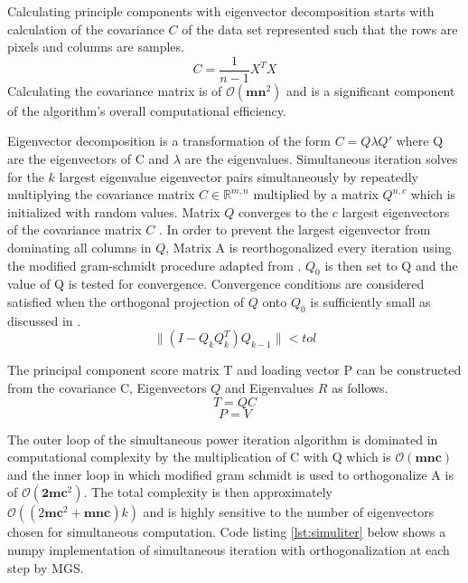 \documentclass[12pt]{article}
\begin{document}
Calculating principle components with eigenvector decomposition starts with calculation of the covariance $C$ of the data set represented such that the rows are pixels and columns are samples. 
$$C=\frac{1}{n-1}X^TX$$
Calculating the covariance matrix is of $\mathcal{O}(\textbf{mn}^2)$ and is a significant component of the algorithm’s overall computational efficiency.

Eigenvector decomposition is a transformation of the form $C=Q \lambda Q'$ where Q are the eigenvectors of C and $\lambda$ are the eigenvalues. Simultaneous iteration solves for the $k$ largest eigenvalue eigenvector pairs simultaneously by repeatedly multiplying the covariance matrix $C \in \mathbb{R}^{m,n}$ multiplied by a matrix $Q^{n,c}$ which is initialized with random values. Matrix $Q$ converges to the $c$ largest eigenvectors of the covariance matrix $C$ \cite{trefethen1997numerical}. In order to prevent the largest eigenvector from dominating all columns in $Q$, Matrix A is reorthogonalized every iteration using the modified gram-schmidt procedure adapted from \cite{srinivasan}. $Q_0$ is then set to Q and the value of Q is tested for convergence. Convergence conditions are considered satisfied when the orthogonal projection of $Q$ onto $Q_0$ is sufficiently small as discussed in \cite{arbenz2012lecture}. 
$$ \|(I-Q_kQ_k^T)Q_{k-1}\|<tol$$

The principal component score matrix T and loading vector P can be constructed from the covariance C,  Eigenvectors $Q$ and Eigenvalues $R$ as follows.
$$T=QC$$
$$P=V$$

The outer loop of the simultaneous power iteration algorithm is dominated in computational complexity by the multiplication of C with Q which is $\mathcal{O}(\textbf{mnc})$ and the inner loop in which modified gram schmidt is used to orthogonalize A is of $\mathcal{O}(\textbf{2mc}^2)$. The total complexity is then approximately $\mathcal{O}((2\textbf{mc}^2+\textbf{mnc})k)$ and is highly sensitive to the number of eigenvectors chosen for simultaneous computation. Code listing \ref{lst:simuliter} below shows a numpy implementation of simultaneous iteration with orthogonalization at each step by MGS. 
\end{document}
